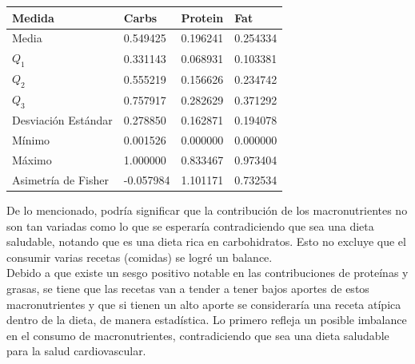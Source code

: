 \documentclass[12pt,a4paper]{article}
\begin{document}
            \begin{center}
                \begin{tabular}{l|lll}
                    \toprule
                        Medida & Carbs & Protein & Fat \\
                    \midrule
                        Media               & 0.549425 & 0.196241 & 0.254334  \\
                        $Q_1$               & 0.331143 & 0.068931 & 0.103381  \\
                        $Q_2$               & 0.555219 & 0.156626 & 0.234742  \\
                        $Q_3$               & 0.757917 & 0.282629 &	0.371292  \\
                        Desviación Estándar & 0.278850 & 0.162871 & 0.194078  \\
                        Mínimo              & 0.001526 & 0.000000 & 0.000000  \\
                        Máximo              & 1.000000 & 0.833467 & 0.973404  \\
                        Asimetría de Fisher & -0.057984 & 1.101171 & 0.732534  \\
                    \bottomrule
                \end{tabular}
            \end{center}

            De lo mencionado, podría significar que la contribución de los macronutrientes 
            no son tan variadas como lo que se esperaría contradiciendo que sea una 
            dieta saludable, notando que es una dieta rica en carbohidratos. Esto no 
            excluye que el consumir varias recetas (comidas) se logré un balance.\\

            Debido a que existe un sesgo positivo notable en las contribuciones de 
            proteínas y grasas, se tiene que las recetas van a tender a tener bajos 
            aportes de estos macronutrientes y que si tienen un alto aporte se 
            consideraría una receta atípica dentro de la dieta, de manera estadística. 
            Lo primero refleja un posible imbalance en el consumo de macronutrientes, 
            contradiciendo que sea una dieta saludable para la salud cardiovascular.
\end{document}
